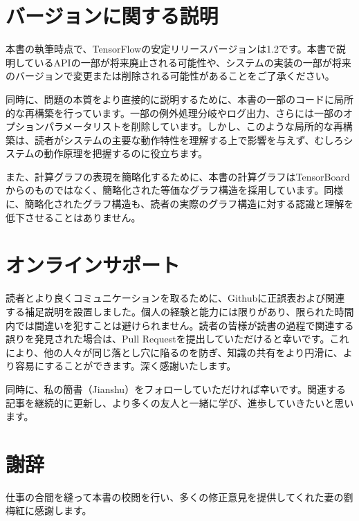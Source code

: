 \section*{バージョンに関する説明}

\begin{content}

本書の執筆時点で、TensorFlowの安定リリースバージョンは1.2です。本書で説明しているAPIの一部が将来廃止される可能性や、システムの実装の一部が将来のバージョンで変更または削除される可能性があることをご了承ください。

同時に、問題の本質をより直接的に説明するために、本書の一部のコードに局所的な再構築を行っています。一部の例外処理分岐やログ出力、さらには一部のオプションパラメータリストを削除しています。しかし、このような局所的な再構築は、読者がシステムの主要な動作特性を理解する上で影響を与えず、むしろシステムの動作原理を把握するのに役立ちます。

また、計算グラフの表現を簡略化するために、本書の計算グラフはTensorBoardからのものではなく、簡略化された等価なグラフ構造を採用しています。同様に、簡略化されたグラフ構造も、読者の実際のグラフ構造に対する認識と理解を低下させることはありません。

\end{content}

\section*{オンラインサポート}

\begin{content}

読者とより良くコミュニケーションを取るために、Githubに正誤表および関連する補足説明を設置しました。個人の経験と能力には限りがあり、限られた時間内では間違いを犯すことは避けられません。読者の皆様が読書の過程で関連する誤りを発見された場合は、Pull Requestを提出していただけると幸いです。これにより、他の人々が同じ落とし穴に陥るのを防ぎ、知識の共有をより円滑に、より容易にすることができます。深く感謝いたします。

同時に、私の簡書（Jianshu）をフォローしていただければ幸いです。関連する記事を継続的に更新し、より多くの友人と一緒に学び、進歩していきたいと思います。

\begin{enum}
\end{enum}

\end{content}

\section*{謝辞}

\begin{content}

仕事の合間を縫って本書の校閲を行い、多くの修正意見を提供してくれた妻の劉梅紅に感謝します。

\end{content}

